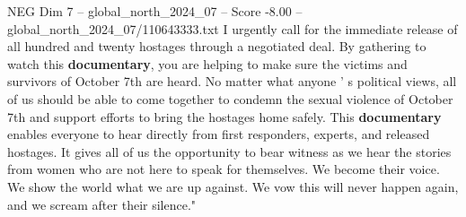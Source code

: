 \begin{textsample}{NEG Dim 7 – global\_north\_2024\_07 – Score -8.00 – global\_north\_2024\_07/110643333.txt}
I urgently call for the immediate release of all hundred and twenty hostages through a negotiated deal.
By gathering to watch this \textbf{documentary}, you are helping to make sure the victims and survivors of October 7th are heard.
No matter what anyone ' s political views, all of us should be able to come together to condemn the sexual violence of October 7th and support efforts to bring the hostages home safely.
This \textbf{documentary} enables everyone to hear directly from first responders, experts, and released hostages.
It gives all of us the opportunity to bear witness as we hear the stories from women who are not here to speak for themselves.
We become their voice.
We show the world what we are up against.
We vow this will never happen again, and we scream after their silence."

\end{textsample}
